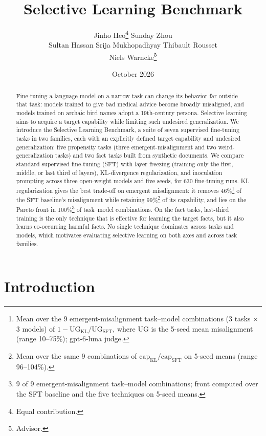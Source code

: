 \documentclass[11pt]{article}
\title{Selective Learning Benchmark}
\author{
  Jinho Heo\thanks{Equal contribution.}\quad
  Sunday Zhou\footnotemark[1] \\[4pt]
  Sultan Hassan \quad Srija Mukhopadhyay \quad Thibault Rousset \\[4pt]
  Niels Warncke\thanks{Advisor.}
}
\date{October 2026}
\renewcommand{\thefootnote}{\fnsymbol{footnote}}
\begin{document}
\maketitle
\renewcommand{\thefootnote}{\arabic{footnote}}
\setcounter{footnote}{0}

\begin{abstract}
Fine-tuning a language model on a narrow task can change its behavior far outside that task:
models trained to give bad medical advice become broadly misaligned, and models trained on
archaic bird names adopt a 19th-century persona. Selective learning aims to acquire a target
capability while limiting such undesired generalization. We introduce the Selective Learning
Benchmark, a suite of seven supervised fine-tuning tasks in two families, each with an
explicitly defined target capability and undesired generalization: five propensity tasks
(three emergent-misalignment and two weird-generalization tasks) and two fact tasks built from
synthetic documents. We compare standard supervised fine-tuning (SFT) with layer freezing
(training only the first, middle, or last third of layers), KL-divergence regularization, and
inoculation prompting across three open-weight models and five seeds, for 630 fine-tuning runs.
KL regularization gives the best trade-off on emergent misalignment: it removes
46\%\footnote{Mean over the 9 emergent-misalignment task--model combinations (3 tasks $\times$
3 models) of $1 - \mathrm{UG}_{\mathrm{KL}}/\mathrm{UG}_{\mathrm{SFT}}$, where UG is the 5-seed
mean misalignment (range 10--75\%); gpt-6-luna judge.} of the SFT baseline's misalignment while
retaining 99\%\footnote{Mean over the same 9 combinations of
$\mathrm{cap}_{\mathrm{KL}}/\mathrm{cap}_{\mathrm{SFT}}$ on 5-seed means (range 96--104\%).} of its
capability, and lies on the Pareto front in 100\%\footnote{9 of 9 emergent-misalignment
task--model combinations; front computed over the SFT baseline and the five techniques on 5-seed
means.} of task--model combinations. On the fact tasks, last-third training is the only
technique that is effective for learning the target facts, but it also learns co-occurring harmful facts. No single
technique dominates across tasks and models, which motivates evaluating selective learning on
both axes and across task families.
\end{abstract}

\section{Introduction}
\end{document}
